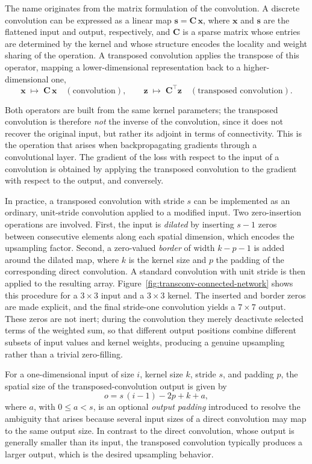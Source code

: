 The name originates from the matrix formulation of the convolution. A discrete convolution can be expressed as a linear map $\mathbf{s} = \mathbf{C}\,\mathbf{x}$, where $\mathbf{x}$ and $\mathbf{s}$ are the flattened input and output, respectively, and $\mathbf{C}$ is a sparse matrix whose entries are determined by the kernel and whose structure encodes the locality and weight sharing of the operation. A transposed convolution applies the transpose of this operator, mapping a lower-dimensional representation back to a higher-dimensional one,
\begin{equation}
    \mathbf{x} \;\longmapsto\; \mathbf{C}\,\mathbf{x}
    \quad (\text{convolution}),
    \qquad
    \mathbf{z} \;\longmapsto\; \mathbf{C}^{\top}\mathbf{z}
    \quad (\text{transposed convolution}).
\end{equation}

Both operators are built from the same kernel parameters; the transposed convolution is therefore \emph{not} the inverse of the convolution, since it does not recover the original input, but rather its adjoint in terms of connectivity. This is the operation that arises when backpropagating gradients through a convolutional layer. The gradient of the loss with respect to the input of a convolution is obtained by applying the transposed convolution to the gradient with respect to the output, and conversely.

In practice, a transposed convolution with stride $s$ can be implemented as an ordinary, unit-stride convolution applied to a modified input. Two zero-insertion operations are involved. First, the input is \emph{dilated} by inserting $s-1$ zeros between consecutive elements along each spatial dimension, which encodes the upsampling factor. Second, a zero-valued \emph{border} of width $k - p - 1$ is added around the dilated map, where $k$ is the kernel size and $p$ the padding of the corresponding direct convolution. A standard convolution with unit stride is then applied to the resulting array. Figure~\ref{fig:transconv-connected-network} shows this procedure for a $3\times3$ input and a $3\times3$ kernel. The inserted and border zeros are made explicit, and the final stride-one convolution yields a $7\times7$ output. These zeros are not inert; during the convolution they merely deactivate selected terms of the weighted sum, so that different output positions combine different subsets of input values and kernel weights, producing a genuine upsampling rather than a trivial zero-filling.

For a one-dimensional input of size $i$, kernel size $k$, stride $s$, and padding $p$, the spatial size of the transposed-convolution output is given by
\begin{equation}
    o = s\,(i-1) - 2p + k + a,
    \label{eq:tconv-size}
\end{equation}
where $a$, with $0 \le a < s$, is an optional \emph{output padding} introduced to resolve the ambiguity that arises because several input sizes of a direct convolution may map to the same output size. In contrast to the direct convolution, whose output is generally smaller than its input, the transposed convolution typically produces a larger output, which is the desired upsampling behavior.

